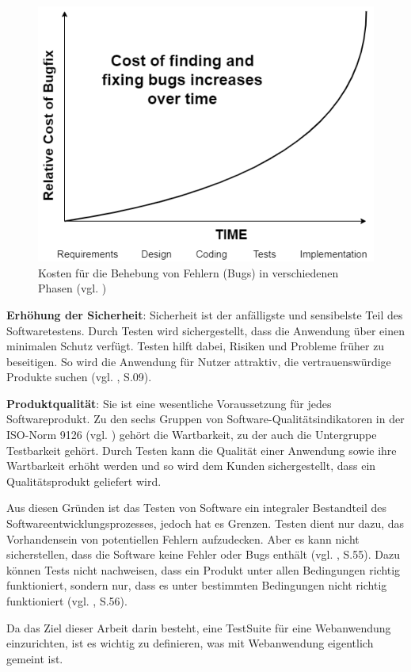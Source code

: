 \begin{figure}[H]
    \centering
    \includegraphics[scale=0.5]{images/Cost-of-fixing-bugs-in-different-phases}
    \caption{Kosten für die Behebung von Fehlern (Bugs) in verschiedenen Phasen (vgl. \cite{kumar2010software})} \label{fig:mof}
\end{figure}


\textbf{Erhöhung der Sicherheit}: Sicherheit ist der anfälligste und
sensibelste Teil des Softwaretestens. Durch Testen wird sichergestellt,
dass die Anwendung über einen minimalen Schutz verfügt. Testen hilft
dabei, Risiken und Probleme früher zu beseitigen. So wird die Anwendung für Nutzer attraktiv,
die vertrauenswürdige Produkte suchen (vgl. \cite{shultz2011software}, S.09).

\textbf{Produktqualität}: Sie ist eine wesentliche
Voraussetzung für jedes Softwareprodukt. Zu den sechs Gruppen von Software-Qualitätsindikatoren
in der ISO-Norm 9126 (vgl. \cite{AlainAbran2010}) gehört die Wartbarkeit, zu der auch die Untergruppe Testbarkeit gehört.
Durch Testen kann die Qualität einer Anwendung sowie ihre Wartbarkeit erhöht werden und so wird dem Kunden sichergestellt,
dass ein Qualitätsprodukt geliefert wird.


Aus diesen Gründen ist das Testen von Software ein
integraler Bestandteil des Softwareentwicklungsprozesses, jedoch hat es Grenzen.
Testen dient nur dazu, das Vorhandensein von potentiellen Fehlern
aufzudecken. Aber es kann nicht sicherstellen, dass
die Software keine Fehler oder Bugs enthält (vgl. \cite{kumar2010software}, S.55).
Dazu können Tests nicht nachweisen, dass ein Produkt unter allen
Bedingungen richtig funktioniert, sondern nur, dass es unter
bestimmten Bedingungen nicht richtig funktioniert (vgl. \cite{kumar2010software}, S.56).



Da das Ziel dieser Arbeit darin besteht, eine \gls{TestSuite} für
eine Webanwendung einzurichten, ist es wichtig zu
definieren, was mit Webanwendung eigentlich gemeint ist.
